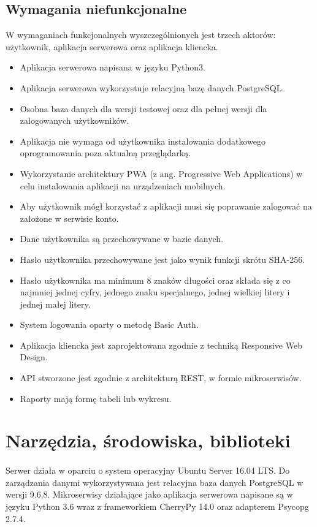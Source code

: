 \documentclass{article}
\begin{document}
	\subsection{Wymagania niefunkcjonalne}
	W wymaganiach funkcjonalnych wyszczególnionych jest trzech aktorów: użytkownik, aplikacja serwerowa oraz aplikacja kliencka.
	\begin{itemize}
		\item Aplikacja serwerowa napisana w języku Python3.
		\item Aplikacja serwerowa wykorzystuje relacyjną bazę danych PostgreSQL.
		\item Osobna baza danych dla wersji testowej oraz dla pełnej wersji dla zalogowanych użytkowników.
		\item Aplikacja nie wymaga od użytkownika instalowania dodatkowego oprogramowania poza aktualną przeglądarką.
		\item Wykorzystanie architektury PWA (z ang. Progressive Web Applications) w celu instalowania aplikacji na urządzeniach mobilnych.
		\item Aby użytkownik mógł korzystać z aplikacji musi się poprawanie zalogować na założone w serwisie konto.
		\item Dane użytkownika są przechowywane w bazie danych.
		\item Hasło użytkownika przechowywane jest jako wynik funkcji skrótu SHA-256.
		\item Hasło użytkownika ma minimum 8 znaków długości oraz składa się z co najmniej jednej cyfry, jednego znaku specjalnego, jednej wielkiej litery i jednej małej litery.
		\item System logowania oparty o metodę Basic Auth.
		\item Aplikacja kliencka jest zaprojektowana zgodnie z techniką Responsive Web Design.
		\item API stworzone jest zgodnie z architekturą REST, w formie mikroserwisów.
		\item Raporty mają formę tabeli lub wykresu.
	\end{itemize}
	\section{Narzędzia, środowiska, biblioteki}
	\paragraph{}Serwer działa w oparciu o system operacyjny Ubuntu Server 16.04 LTS.
	Do zarządzania danymi wykorzystywana jest relacyjna baza danych PostgreSQL w wersji 9.6.8.
	Mikroserwisy działające jako aplikacja serwerowa napisane są w języku Python 3.6 wraz z frameworkiem CherryPy 14.0 oraz adapterem Psycopg 2.7.4. 
\end{document}
